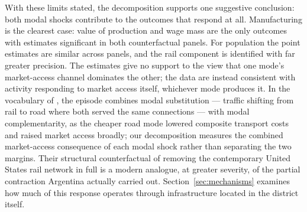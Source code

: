 With these limits stated, the decomposition supports one suggestive
conclusion: both modal shocks contribute to the outcomes that respond
at all. Manufacturing is the clearest case: value of production and
wage mass are the only outcomes with estimates significant in both
counterfactual panels. For population the point estimates are similar
across panels, and the rail component is identified with far greater
precision. The estimates give no support to the view that one mode's
market-access channel dominates the other; the data are instead
consistent with activity responding to market access itself,
whichever mode produces it. In the vocabulary of
\citet{fuchswong2026}, the episode combines modal substitution ---
traffic shifting from rail to road where both served the same
connections --- with modal complementarity, as the cheaper road mode
lowered composite transport costs and raised market access broadly;
our decomposition measures the combined market-access consequence of
each modal shock rather than separating the two margins. Their
structural counterfactual of removing the contemporary United States
rail network in full is a modern analogue, at greater severity, of
the partial contraction Argentina actually carried out.
Section~\ref{sec:mechanisms}
examines how much of this response operates through infrastructure
located in the district itself.
